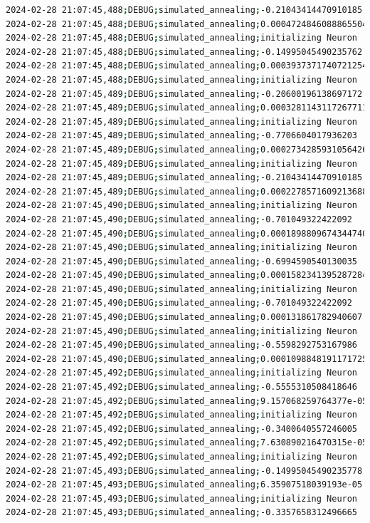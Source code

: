 \documentclass{article}
\begin{document}
\begin{lstlisting}[language=bash, caption=Example Output of Program]
2024-02-28 21:07:45,488;DEBUG;simulated_annealing;-0.21043414470910185
2024-02-28 21:07:45,488;DEBUG;simulated_annealing;0.00047248460888655046
2024-02-28 21:07:45,488;DEBUG;simulated_annealing;initializing Neuron
2024-02-28 21:07:45,488;DEBUG;simulated_annealing;-0.14995045490235762
2024-02-28 21:07:45,488;DEBUG;simulated_annealing;0.0003937371740721254
2024-02-28 21:07:45,488;DEBUG;simulated_annealing;initializing Neuron
2024-02-28 21:07:45,489;DEBUG;simulated_annealing;-0.20600196138697172
2024-02-28 21:07:45,489;DEBUG;simulated_annealing;0.00032811431172677114
2024-02-28 21:07:45,489;DEBUG;simulated_annealing;initializing Neuron
2024-02-28 21:07:45,489;DEBUG;simulated_annealing;-0.7706604017936203
2024-02-28 21:07:45,489;DEBUG;simulated_annealing;0.00027342859310564265
2024-02-28 21:07:45,489;DEBUG;simulated_annealing;initializing Neuron
2024-02-28 21:07:45,489;DEBUG;simulated_annealing;-0.21043414470910185
2024-02-28 21:07:45,489;DEBUG;simulated_annealing;0.00022785716092136888
2024-02-28 21:07:45,490;DEBUG;simulated_annealing;initializing Neuron
2024-02-28 21:07:45,490;DEBUG;simulated_annealing;-0.701049322422092
2024-02-28 21:07:45,490;DEBUG;simulated_annealing;0.00018988096743447407
2024-02-28 21:07:45,490;DEBUG;simulated_annealing;initializing Neuron
2024-02-28 21:07:45,490;DEBUG;simulated_annealing;-0.6994590540130035
2024-02-28 21:07:45,490;DEBUG;simulated_annealing;0.0001582341395287284
2024-02-28 21:07:45,490;DEBUG;simulated_annealing;initializing Neuron
2024-02-28 21:07:45,490;DEBUG;simulated_annealing;-0.701049322422092
2024-02-28 21:07:45,490;DEBUG;simulated_annealing;0.000131861782940607
2024-02-28 21:07:45,490;DEBUG;simulated_annealing;initializing Neuron
2024-02-28 21:07:45,490;DEBUG;simulated_annealing;-0.5598292753167986
2024-02-28 21:07:45,490;DEBUG;simulated_annealing;0.00010988481911717251
2024-02-28 21:07:45,492;DEBUG;simulated_annealing;initializing Neuron
2024-02-28 21:07:45,492;DEBUG;simulated_annealing;-0.5555310508418646
2024-02-28 21:07:45,492;DEBUG;simulated_annealing;9.157068259764377e-05
2024-02-28 21:07:45,492;DEBUG;simulated_annealing;initializing Neuron
2024-02-28 21:07:45,492;DEBUG;simulated_annealing;-0.3400640557246005
2024-02-28 21:07:45,492;DEBUG;simulated_annealing;7.630890216470315e-05
2024-02-28 21:07:45,492;DEBUG;simulated_annealing;initializing Neuron
2024-02-28 21:07:45,493;DEBUG;simulated_annealing;-0.14995045490235778
2024-02-28 21:07:45,493;DEBUG;simulated_annealing;6.35907518039193e-05
2024-02-28 21:07:45,493;DEBUG;simulated_annealing;initializing Neuron
2024-02-28 21:07:45,493;DEBUG;simulated_annealing;-0.3357658312496665

\end{lstlisting}
\end{document}
